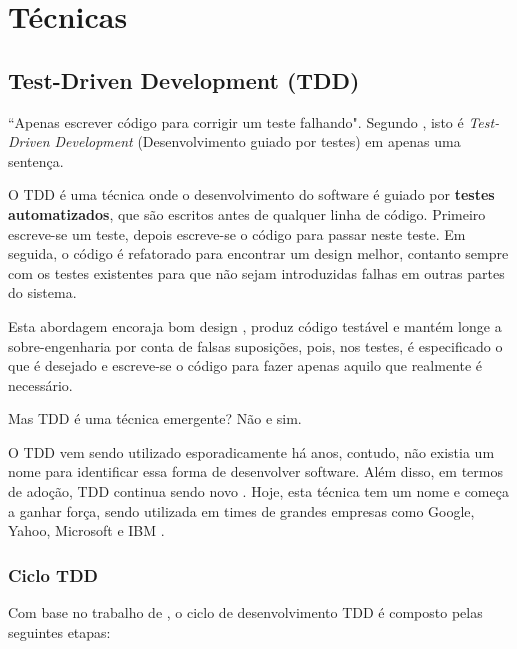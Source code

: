 \chapter{Técnicas}

\section{Test-Driven Development (TDD)}
\label{sub:tdd}
``Apenas escrever código para corrigir um teste falhando". Segundo , isto é \textit{Test-Driven Development} (Desenvolvimento guiado por testes) \cite{TDDbyExample} em apenas uma sentença.

O TDD é uma técnica onde o desenvolvimento do software é guiado por \textbf{testes automatizados}, que são escritos antes de qualquer linha de código. Primeiro escreve-se um teste, depois escreve-se o código para passar neste teste. Em seguida, o código é refatorado para encontrar um design melhor, contanto sempre com os testes existentes para que não sejam introduzidas falhas em outras partes do sistema.

Esta abordagem encoraja bom design \cite{GrowingOOByTests}, produz código testável e mantém longe a sobre-engenharia por conta de falsas suposições, pois, nos testes, é especificado o que é desejado e escreve-se o código para fazer apenas aquilo que realmente é necessário. \cite{TestDrivenKoskela, TDDbyExample, EmpiricalTDD}

Mas TDD é uma técnica emergente? Não e sim.

O TDD vem sendo utilizado esporadicamente há anos, contudo, não existia um nome para identificar essa forma de desenvolver software. Além disso, em termos de adoção, TDD continua sendo novo \cite{TestDrivenKoskela, TDDbyExample, EmpiricalTDD}. Hoje, esta técnica tem um nome e começa a ganhar força, sendo utilizada em times de grandes empresas como Google, Yahoo, Microsoft e IBM \cite{EmpiricalTDD}.

\subsection{Ciclo TDD}
\label{ssub:ciclo_tdd}

Com base no trabalho de , o ciclo de desenvolvimento TDD é composto pelas seguintes etapas:

